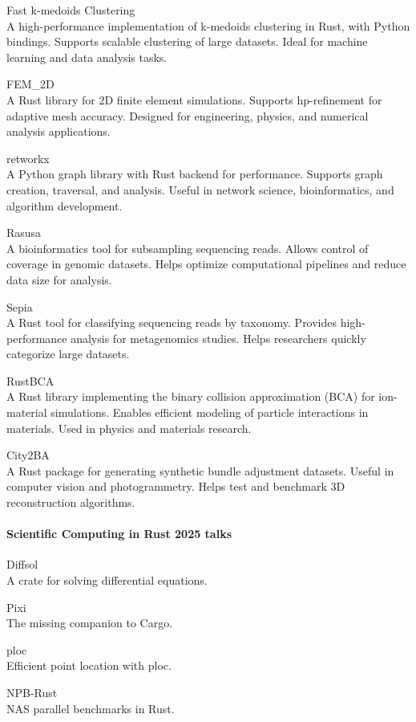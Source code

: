 \documentclass{article}
\begin{document}
Fast k-medoids Clustering\\
A high-performance implementation of k-medoids clustering in Rust, with
Python bindings. Supports scalable clustering of large datasets. Ideal for machine learning and
data analysis tasks.

FEM\_2D\\
A Rust library for 2D finite element simulations. Supports hp-refinement for adaptive
mesh accuracy. Designed for engineering, physics, and numerical analysis applications.

retworkx\\
A Python graph library with Rust backend for performance. Supports graph creation,
traversal, and analysis. Useful in network science, bioinformatics, and algorithm development.

Rasusa\\
A bioinformatics tool for subsampling sequencing reads. Allows control of coverage in
genomic datasets. Helps optimize computational pipelines and reduce data size for analysis.

Sepia\\
A Rust tool for classifying sequencing reads by taxonomy. Provides high-performance
analysis for metagenomics studies. Helps researchers quickly categorize large datasets.

RustBCA\\
A Rust library implementing the binary collision approximation (BCA) for ion-material
simulations. Enables efficient modeling of particle interactions in materials. Used in physics and
materials research.

City2BA\\
A Rust package for generating synthetic bundle adjustment datasets. Useful in computer
vision and photogrammetry. Helps test and benchmark 3D reconstruction algorithms.

\paragraph{Scientific Computing in Rust 2025 talks}

Diffsol\\
A crate for solving differential equations.

Pixi\\
The missing companion to Cargo.

ploc\\
Efficient point location with ploc.

NPB-Rust\\
NAS parallel benchmarks in Rust.
\end{document}
